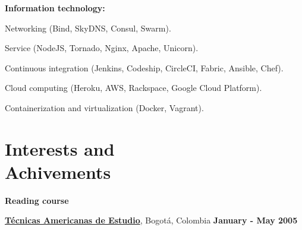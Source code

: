 \halfblankline

\textbf{Information technology:} 
    \begin{innerlist}
\item Networking (Bind, SkyDNS, Consul, Swarm).
\item Service (NodeJS, Tornado, Nginx, Apache, Unicorn).
\item Continuous integration (Jenkins, Codeship, CircleCI,
Fabric, Ansible, Chef).
\item Cloud computing (Heroku, AWS, Rackspace, Google Cloud Platform).
\item Containerization and virtualization (Docker, Vagrant).
    \end{innerlist}

% 
% 
% 


%
% 
% 

% 

\section{Interests and \\ Achivements}
%
\textbf{Reading course}

\begin{outerlist}
\item[\FA \faAngleDoubleRight]
\href{http://www.tecnicasamericanas.com/}{\textbf{T\'ecnicas Americanas de Estudio}}, Bogot\'a, Colombia%
        \hfill \textbf{January - May 2005}
\end{outerlist}

